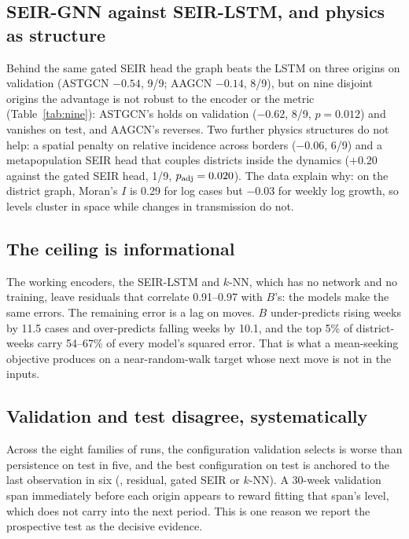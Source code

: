 \subsection{SEIR-GNN against SEIR-LSTM, and physics as structure}
\label{sec:seirgnn}
Behind the same gated SEIR head the graph beats the LSTM on three origins on
validation (ASTGCN $-0.54$, 9/9; AAGCN $-0.14$, 8/9), but on nine disjoint origins the
advantage is not robust to the encoder or the metric (Table~\ref{tab:nine}): ASTGCN's
holds on validation ($-0.62$, 8/9, $p=0.012$) and vanishes on test, and AAGCN's reverses.
Two further physics structures do not help: a spatial penalty on relative incidence
across borders ($-0.06$, 6/9) and a metapopulation SEIR head that couples districts
inside the dynamics ($+0.20$ against the gated SEIR head, 1/9, $p_{\text{adj}}=0.020$). The data
explain why: on the district graph, Moran's $I$ is 0.29 for log cases but $-0.03$ for
weekly log growth, so levels cluster in space while changes in transmission do not.

\subsection{The ceiling is informational}
\label{sec:ceiling}
The working encoders, the SEIR-LSTM and $k$-NN, which has no network and no training,
leave residuals that correlate 0.91--0.97 with $B$'s: the models make the same errors.
The remaining error is a lag on moves. $B$ under-predicts rising weeks by 11.5 cases and
over-predicts falling weeks by 10.1, and the top 5\% of district-weeks carry 54--67\% of
every model's squared error. That is what a mean-seeking objective produces on a
near-random-walk target whose next move is not in the inputs.

\subsection{Validation and test disagree, systematically}
\label{sec:valtest}
Across the eight families of runs, the configuration validation selects is worse than
persistence on test in five, and the best configuration on test is anchored to the
last observation in six (\model{}, residual, gated SEIR or $k$-NN). A 30-week validation
span immediately before each origin appears to reward fitting that span's level, which
does not carry into the next period. This is one reason we report the prospective test
as the decisive evidence.
